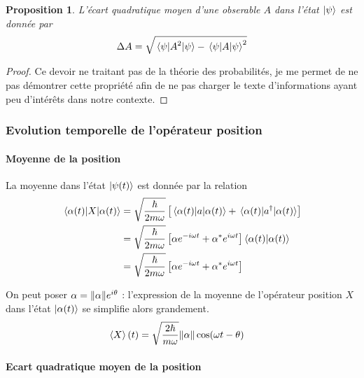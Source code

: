\documentclass[11pt,oneside,a4paper]{article}
\newcommand{\h}{\ensuremath{\hbar}}
\newtheorem{property}[theorem]{Proposition}
\begin{document}
\begin{property}
  L'écart quadratique moyen d'une obserable $A$ dans l'état $\ket{\psi}$ est donnée par
  \begin{align}
    \label{ecart quadratique moyen}
    \Delta A = \sqrt{\expval{A^2}{\psi} - \expval{A}{\psi}^2}
  \end{align}
\end{property}
\begin{proof}
  Ce devoir ne traitant pas de la théorie des probabilités, je me permet de ne pas démontrer cette propriété afin de ne pas charger le texte d'informations ayant peu d'intérêts dans notre contexte.
\end{proof}

\subsubsection{Evolution temporelle de l'opérateur position}
\label{Evolution temporelle de l'opérateur position}

\paragraph{Moyenne de la position}

La moyenne dans l'état $\ket{\psi(t)}$ est donnée par la relation
\begin{align}
  \expval{X}{{\alpha(t)}} &= \sqrt{\frac{\h}{2m\omega}}\left[\expval{a}{\alpha(t)}+\expval{a^\dagger}{\alpha(t)}\right]\\
  &= \sqrt{\frac{\h}{2m\omega}} \left[\alpha e^{-i\omega t}+\alpha^*e^{i\omega t}\right]\braket{\alpha(t)}\\
  &= \sqrt{\frac{\h}{2m\omega}} \left[\alpha e^{-i\omega t}+\alpha^*e^{i\omega t}\right]
\end{align}

On peut poser $\alpha = \norm{\alpha}e^{i\theta}$ : l'expression de la moyenne de l'opérateur position $X$ dans l'état $\ket{\alpha(t)}$ se simplifie alors grandement.
\begin{align}
  \label{mean position}
  \expval{X}(t)&= \sqrt{\frac{2\h}{m\omega}}\norm{\alpha}\cos(\omega t-\theta)
\end{align}

\paragraph{Ecart quadratique moyen de la position}
\end{document}
